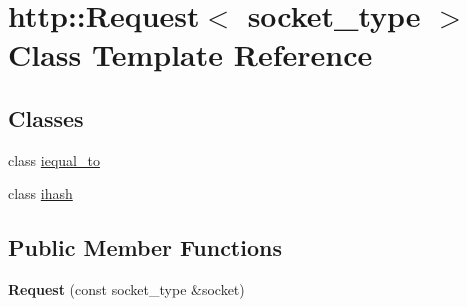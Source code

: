 \hypertarget{classhttp_1_1_request}{}\section{http\+:\+:Request$<$ socket\+\_\+type $>$ Class Template Reference}
\label{classhttp_1_1_request}
\subsection*{Classes}
\begin{DoxyCompactItemize}
\item 
class \hyperlink{classhttp_1_1_request_1_1iequal__to}{iequal\+\_\+to}
\item 
class \hyperlink{classhttp_1_1_request_1_1ihash}{ihash}
\end{DoxyCompactItemize}
\subsection*{Public Member Functions}
\begin{DoxyCompactItemize}
\item 
\mbox{\label{classhttp_1_1_request_ad8961af228375425f762d5f089468b05}} 
{\bfseries Request} (const socket\+\_\+type \&socket)
\end{DoxyCompactItemize}
